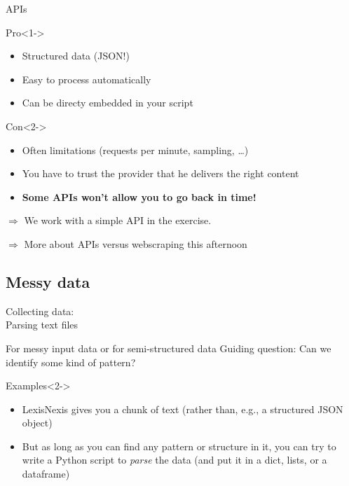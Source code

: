 \documentclass[compress]{beamer}
\begin{document}
\begin{frame}{APIs}
	\begin{block}{Pro}<1->
		\begin{itemize}
			\item Structured data (JSON!)
			\item Easy to process automatically
			\item Can be directy embedded in your script
		\end{itemize}
	\end{block}
	\begin{block}{Con}<2->
		\begin{itemize}
			\item Often limitations (requests per minute, sampling, \ldots)
			\item You have to trust the provider that he delivers the right content \parencite{Morstatter2013} 
			\item {\textbf{Some APIs won't allow you to go back in time!}}
		\end{itemize}
	\end{block}


$\Rightarrow$ We work with a simple API in the exercise.

$\Rightarrow$ More about APIs versus webscraping this afternoon
\end{frame}


\subsection{Messy data}

\begin{frame}
	Collecting data:\\
	Parsing text files
\end{frame}

\begin{frame}{For messy input data or for semi-structured data}
	Guiding question: Can we identify some kind of pattern?
	\begin{block}{Examples}<2->
		\begin{itemize}
			\item<3-> LexisNexis gives you a chunk of text (rather than, e.g., a structured JSON object)
			\item<3-> But as long as you can find any pattern or structure in it, you can try to write a Python script to \emph{parse} the data (and put it in a dict, lists, or a dataframe)
		\end{itemize}
	\end{block}
\end{frame}
\end{document}
